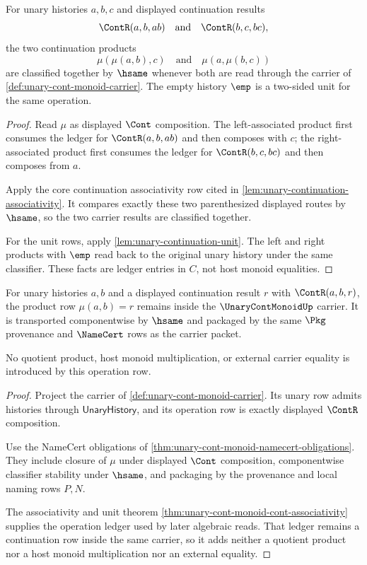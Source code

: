 \begin{theorem}
\label{thm:unary-cont-monoid-cont-associativity}
For unary histories $a,b,c$ and displayed continuation results
$$
\ContR(a,b,ab)
\quad\text{and}\quad
\ContR(b,c,bc),
$$
the two continuation products
$$
\mu(\mu(a,b),c)
\quad\text{and}\quad
\mu(a,\mu(b,c))
$$
are classified together by $\hsame$ whenever both are read through the carrier of \autoref{def:unary-cont-monoid-carrier}. The empty history $\emp$ is a two-sided unit for the same operation.
\end{theorem}
\begin{proof}
Read $\mu$ as displayed $\Cont$ composition. The left-associated product first consumes the ledger for $\ContR(a,b,ab)$ and then composes with $c$; the right-associated product first consumes the ledger for $\ContR(b,c,bc)$ and then composes from $a$.

Apply the core continuation associativity row cited in \autoref{lem:unary-continuation-associativity}. It compares exactly these two parenthesized displayed routes by $\hsame$, so the two carrier results are classified together.

For the unit rows, apply \autoref{lem:unary-continuation-unit}. The left and right products with $\emp$ read back to the original unary history under the same classifier. These facts are ledger entries in $C$, not host monoid equalities.
\end{proof}

\begin{theorem}
\label{thm:unary-cont-monoid-operation-closure}
For unary histories $a,b$ and a displayed continuation result $r$ with $\ContR(a,b,r)$, the product row $\mu(a,b)=r$ remains inside the $\UnaryContMonoidUp$ carrier. It is transported componentwise by $\hsame$ and packaged by the same $\Pkg$ provenance and $\NameCert$ rows as the carrier packet.

No quotient product, host monoid multiplication, or external carrier equality is introduced by this operation row.
\end{theorem}
\begin{proof}
Project the carrier of \autoref{def:unary-cont-monoid-carrier}. Its unary row admits histories through $\mathsf{UnaryHistory}$, and its operation row is exactly displayed $\ContR$ composition.

Use the NameCert obligations of \autoref{thm:unary-cont-monoid-namecert-obligations}. They include closure of $\mu$ under displayed $\Cont$ composition, componentwise classifier stability under $\hsame$, and packaging by the provenance and local naming rows $P,N$.

The associativity and unit theorem \autoref{thm:unary-cont-monoid-cont-associativity} supplies the operation ledger used by later algebraic reads. That ledger remains a continuation row inside the same carrier, so it adds neither a quotient product nor a host monoid multiplication nor an external equality.
\end{proof}

